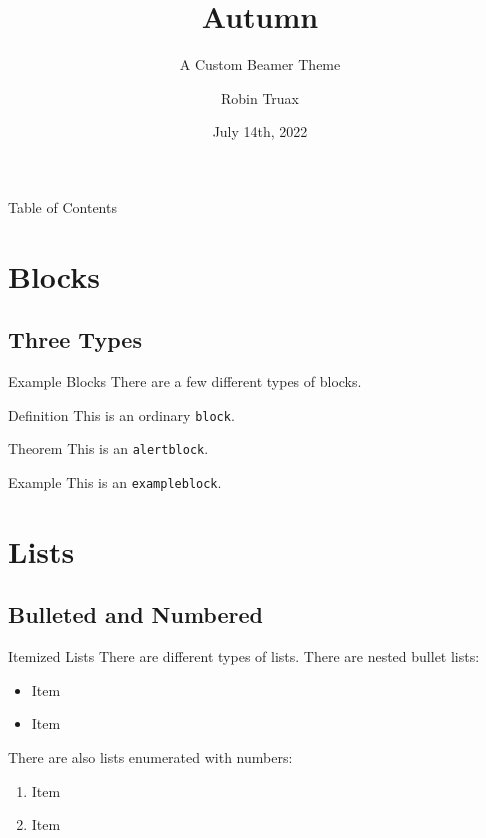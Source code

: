 \documentclass[compress]{beamer}
\title{Autumn}
\subtitle{A Custom Beamer Theme \subtitleline}
\author{Robin Truax}
\institute{Stanford University}
\date{July 14th, 2022}
\begin{document}
\begin{frame}[plain]
\titlepage
\end{frame}

\begin{frame}{Table of Contents}
    \tableofcontents
\end{frame}

\section{Blocks}
\subsection{Three Types}
\begin{frame}{Example Blocks}
There are a few different types of blocks.
\begin{block}{Definition}
This is an ordinary \texttt{block}.
\end{block}
\begin{alertblock}{Theorem}
This is an \texttt{alertblock}. 
\end{alertblock}
\begin{exampleblock}{Example}
This is an \texttt{exampleblock}.
\end{exampleblock}
\end{frame}

\section{Lists}
\subsection{Bulleted and Numbered}
\begin{frame}{Itemized Lists}
There are different types of lists. There are nested bullet lists: 
\begin{itemize}
    \item Item
    \item Item
\end{itemize}
There are also lists enumerated with numbers: 
\begin{enumerate}
    \item Item
    \item Item
\end{enumerate}
\end{frame}
\end{document}
